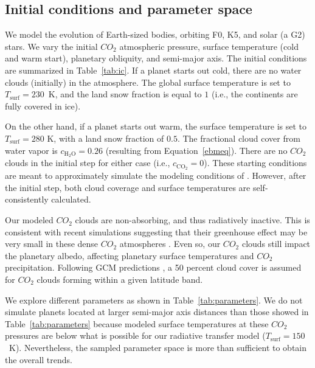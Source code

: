 \documentclass[fleqn,usenatbib]{mnras}
\begin{document}
\subsection{Initial conditions and parameter space}
We model the evolution of Earth-sized bodies, orbiting  F0, K5, and solar (a G2) stars. We vary the initial $CO_{\mathrm{2}}$ atmospheric pressure, surface temperature (cold and warm start), planetary obliquity, and semi-major axis. The initial conditions are summarized in Table~\ref{tab:ic}. If a planet starts out cold, there are no water clouds (initially) in the atmosphere. The global surface temperature is set to $T_{\mathrm{surf}}=230$~K, and the land snow fraction is equal to $1$ (i.e., the continents are fully covered in ice).

On the other hand, if a planet starts out warm, the surface temperature is set to $T_{\mathrm{surf}}=280$ K, with a land snow fraction of $0.5$. The fractional cloud cover from water vapor is $c_{\mathrm{H_{\mathrm{2}}O}}=0.26$ (resulting from Equation~\ref{ebmeq}). 
There are no $CO_{\mathrm{2}}$ clouds in the initial step for either case (i.e., $c_{\mathrm{CO_{\mathrm{2}}}}=0$). These starting conditions are meant to approximately simulate the modeling conditions of \citet{Turbet2017}. However, after the initial step, both cloud coverage and surface temperatures are self-consistently calculated. 

Our modeled $CO_{\mathrm{2}}$ clouds are non-absorbing, and thus radiatively inactive. This is consistent with recent simulations suggesting that their greenhouse effect may be very small in these dense $CO_{\mathrm{2}}$ atmospheres \citep{kitzmann2016}. Even so, our $CO_{\mathrm{2}}$ clouds still impact the planetary albedo, affecting planetary surface temperatures and $CO_{\mathrm{2}}$ precipitation. Following GCM predictions \citep{forget2013}, a 50 percent cloud cover is assumed for $CO_{\mathrm{2}}$ clouds forming within a given latitude band. 


We explore different parameters as shown in Table~\ref{tab:parameters}. We do not simulate planets located at larger semi-major axis distances than those showed in Table~\ref{tab:parameters} because modeled surface temperatures at these $CO_{\mathrm{2}}$ pressures are below what is possible for our radiative transfer model ($T_{\mathrm{surf}}=150$~K). Nevertheless, the sampled parameter space is more than sufficient to obtain the overall trends.
\end{document}
